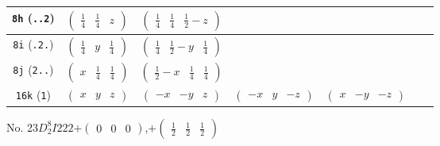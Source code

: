 \documentclass[fleqn,9pt,landscape]{jsarticle}
\begin{document}
\begin{center}
\begin{longtable}{ccccccc}
{\tt 8h} ({\tt ..2}) & $ \begin{pmatrix} \frac{1}{4} & \frac{1}{4} & z \end{pmatrix} $ & $ \begin{pmatrix} \frac{1}{4} & \frac{1}{4} & \frac{1}{2} - z \end{pmatrix} $ & $  $ & $  $ \\ \hline
{\tt 8i} ({\tt .2.}) & $ \begin{pmatrix} \frac{1}{4} & y & \frac{1}{4} \end{pmatrix} $ & $ \begin{pmatrix} \frac{1}{4} & \frac{1}{2} - y & \frac{1}{4} \end{pmatrix} $ & $  $ & $  $ \\ \hline
{\tt 8j} ({\tt 2..}) & $ \begin{pmatrix} x & \frac{1}{4} & \frac{1}{4} \end{pmatrix} $ & $ \begin{pmatrix} \frac{1}{2} - x & \frac{1}{4} & \frac{1}{4} \end{pmatrix} $ & $  $ & $  $ \\ \hline
{\tt 16k} ({\tt 1}) & $ \begin{pmatrix} x & y & z \end{pmatrix} $ & $ \begin{pmatrix} - x & - y & z \end{pmatrix} $ & $ \begin{pmatrix} - x & y & - z \end{pmatrix} $ & $ \begin{pmatrix} x & - y & - z \end{pmatrix} $ \\
\end{longtable}
\end{center}
\newpage
No. 23\quad$D_{2}^{8}$\quad$I222$\quad[ orthorhombic ]\quad$+\begin{pmatrix} 0 & 0 & 0 \end{pmatrix}$,\quad $+\begin{pmatrix} \frac{1}{2} & \frac{1}{2} & \frac{1}{2} \end{pmatrix}$
\end{document}
